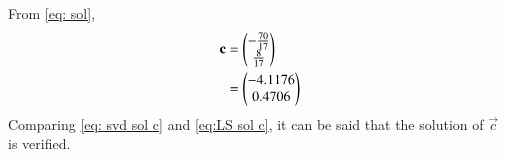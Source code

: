 \documentclass[journal,12pt,twocolumn]{IEEEtran}
\begin{document}
From \eqref{eq: sol}, 
\begin{align}
    \mathbf c & = \begin{pmatrix} -\frac{70}{17}\\ \frac{8}{17}\end{pmatrix}\\
     & = \begin{pmatrix}-4.1176 \\ 0.4706\end{pmatrix}\label{eq:LS sol c}
\end{align}
Comparing \eqref{eq: svd sol c} and \eqref{eq:LS sol c}, it can be said that the solution of $\vec c$ is verified.
\end{document}
